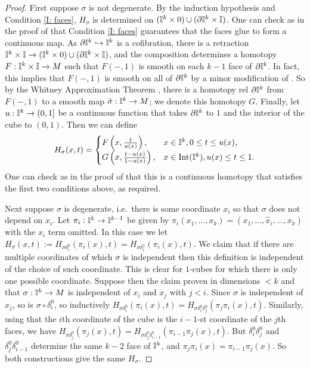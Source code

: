 \begin{proof}
First suppose $\sigma$ is not degenerate. By the induction hypothesis and Condition \eqref{I: faces}, $H_\sigma$ is determined on $(\mathbb{I}^k\times 0)\cup (\partial \mathbb{I}^k\times \mathbb{I})$. One can check as in the proof of \cite[Lemma 18.8]{Lee13} that Condition \eqref{I: faces} guarantees that the faces glue to form a continuous map. As $\partial \mathbb{I}^k\hookrightarrow \mathbb{I}^k$ is a cofibration, there is a retraction $\mathbb{I}^k\times\mathbb{I}\to (\mathbb{I}^k\times 0)\cup (\partial \mathbb{I}^k\times \mathbb{I})$, and the composition determines a homotopy $F:\mathbb{I}^k\times\mathbb{I}\to M$ such that $F(-,1)$ is smooth on each $k-1$ face of $\partial \mathbb{I}^k$. In fact, this implies that $F(-,1)$ is smooth on all of $\partial \mathbb{I}^k$ by a minor modification of \cite[Lemma 18.9]{Lee13}. So by the Whitney Approximation Theorem \cite[Theorem 6.26]{Lee13}, there is a homotopy rel $\partial \mathbb{I}^k$ from $F(-,1)$ to a smooth map $\tilde \sigma:\mathbb{I}^k\to M$; we denote this homotopy $G$. Finally, let $u:\mathbb{I}^k\to (0,1]$ be a continuous function that takes $\partial\mathbb{I}^k$ to $1$ and the interior of the cube to $(0,1)$. Then we can define
\begin{equation*}
H_\sigma(x,t)=
\begin{cases}
F\left(x,\frac{t}{u(x)}\right),&x\in \mathbb{I}^k, 0\leq t\leq u(x),\\
G\left(x,\frac{t-u(x)}{1-u(x)}\right),&x\in \text{Int}(\mathbb{I}^k), u(x)\leq t\leq 1.\\
\end{cases}
\end{equation*}
One can check as in the proof of \cite[Lemma 18.8]{Lee13} that this is a continuous homotopy that satisfies the first two conditions above, as required.

Next suppose $\sigma$ is degenerate, i.e.\ there is some coordinate $x_i$ so that $\sigma$ does not depend on $x_i$. Let $\pi_i:\mathbb{I}^k\to\mathbb{I}^{k-1}$ be given by $\pi_i(x_1,\ldots, x_k)=(x_1,\ldots, \hat x_i, \ldots, x_k)$ with the $x_i$ term omitted. In this case we let $H_\sigma(x,t):=H_{\sigma \delta_i^0}(\pi_i(x),t)=H_{\sigma \delta_i^1}(\pi_i(x),t)$.
 We claim that if there are multiple coordinates of which $\sigma$ is independent then this definition is independent of the choice of such coordinate. This is clear for $1$-cubes for which there is only one possible coordinate. Suppose then the claim proven in dimensions $<k$ and that $\sigma:\mathbb{I}^k\to M$ is independent of $x_i$ and $x_j$ with $j<i$. Since $\sigma$ is independent of $x_j$, so is $\sigma\circ \delta_i^0$, so inductively   $H_{\sigma \delta_i^0}(\pi_i(x),t)=H_{\sigma \delta_i^0\delta_j^0}(\pi_j\pi_i(x),t)$. Similarly, using that the $i$th coordinate of the cube is the $i-1$-st coordinate of the $j$th faces, we have $H_{\sigma \delta_j^0}(\pi_j(x),t)=H_{\sigma \delta_j^0\delta_{i-1}^0}(\pi_{i-1}\pi_j(x),t)$. But $\delta_i^0\delta_j^0$ and $\delta_j^0\delta_{i-1}^0$ determine the same $k-2$ face of $\mathbb{I}^k$, and $\pi_j\pi_i(x)=\pi_{i-1}\pi_j(x)$. So both constructions give the same $H_\sigma$.


\end{proof}
